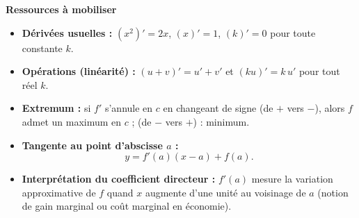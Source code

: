 \documentclass[11pt]{article}
\newcommand{\cle}[1]{{\popxbold\color{popdark}#1}}
\begin{document}
\textbf{Ressources à mobiliser}\par
\begin{aretenir}
\begin{itemize}
\item \textbf{Dérivées usuelles :} $(x^2)' = 2x$, $(x)' = 1$, $(k)' = 0$ pour toute constante $k$.
\item \textbf{Opérations (linéarité) :} $(u+v)' = u'+v'$ et $(ku)' = k\,u'$ pour tout réel $k$.
\item \textbf{Extremum :} si $f'$ s'annule en $c$ en changeant de signe (de $+$ vers $-$), alors $f$ admet un maximum en $c$ ; (de $-$ vers $+$) : minimum.
\item \textbf{Tangente au point d'abscisse $a$ :}
\[ y = f'(a)(x - a) + f(a). \]
\item \textbf{Interprétation du coefficient directeur :} $f'(a)$ mesure la variation approximative de $f$ quand $x$ augmente d'une unité au voisinage de $a$ (notion de \cle{gain marginal} ou \cle{coût marginal} en économie).
\end{itemize}
\end{aretenir}
\end{document}
